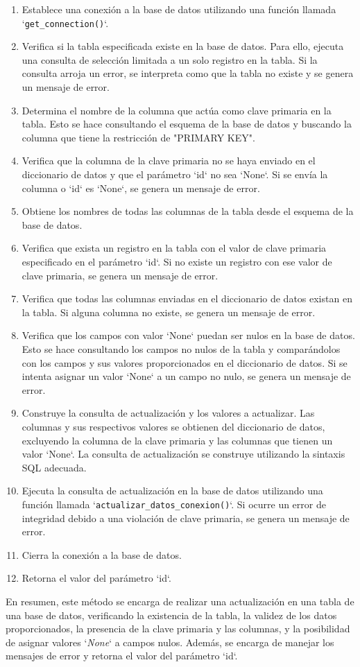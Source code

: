 \documentclass[12pt]{report}
\begin{document}
\begin{itemize}
\begin{enumerate}
    \item Establece una conexión a la base de datos utilizando una función llamada `\texttt{get\_connection()}`.
    \item Verifica si la tabla especificada existe en la base de datos. Para ello, ejecuta una consulta de selección limitada a un solo registro en la tabla. Si la consulta arroja un error, se interpreta como que la tabla no existe y se genera un mensaje de error.
    \item Determina el nombre de la columna que actúa como clave primaria en la tabla. Esto se hace consultando el esquema de la base de datos y buscando la columna que tiene la restricción de "PRIMARY KEY".
    \item Verifica que la columna de la clave primaria no se haya enviado en el diccionario de datos y que el parámetro `id` no sea `None`. Si se envía la columna o `id` es `None`, se genera un mensaje de error.
    \item Obtiene los nombres de todas las columnas de la tabla desde el esquema de la base de datos.
    \item Verifica que exista un registro en la tabla con el valor de clave primaria especificado en el parámetro `id`. Si no existe un registro con ese valor de clave primaria, se genera un mensaje de error.
    \item Verifica que todas las columnas enviadas en el diccionario de datos existan en la tabla. Si alguna columna no existe, se genera un mensaje de error.
    \item Verifica que los campos con valor `None` puedan ser nulos en la base de datos. Esto se hace consultando los campos no nulos de la tabla y comparándolos con los campos y sus valores proporcionados en el diccionario de datos. Si se intenta asignar un valor `None` a un campo no nulo, se genera un mensaje de error.
    \item Construye la consulta de actualización y los valores a actualizar. Las columnas y sus respectivos valores se obtienen del diccionario de datos, excluyendo la columna de la clave primaria y las columnas que tienen un valor `None`. La consulta de actualización se construye utilizando la sintaxis SQL adecuada.
    \item Ejecuta la consulta de actualización en la base de datos utilizando una función llamada `\texttt{actualizar\_datos\_conexion()}`. Si ocurre un error de integridad debido a una violación de clave primaria, se genera un mensaje de error.
    \item Cierra la conexión a la base de datos.
    \item Retorna el valor del parámetro `id`.
\end{enumerate}

En resumen, este método se encarga de realizar una actualización en una tabla de una base de datos, verificando la existencia de la tabla, la validez de los datos proporcionados, la presencia de la clave primaria y las columnas, y la posibilidad de asignar valores `\textit{None}` a campos nulos. Además, se encarga de manejar los mensajes de error y retorna el valor del parámetro `id`.
\end{itemize}
\end{document}
